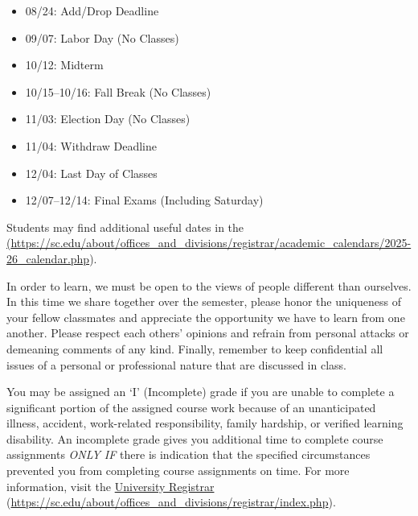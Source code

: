 \documentclass[11pt,letterpaper]{article}
\begin{document}

	\begin{itemize}
	\item 08/24: Add/Drop Deadline
	\item 09/07: Labor Day (No Classes)
	\item 10/12: Midterm
	\item 10/15--10/16: Fall Break (No Classes)
	\item 11/03: Election Day (No Classes)
	\item 11/04: Withdraw Deadline
	\item 12/04: Last Day of Classes
	\item 12/07--12/14: Final Exams (Including Saturday)
	\end{itemize}

Students may find additional useful dates in the \href{https://sc.edu/about/offices\_and\_divisions/registrar/academic\_calendars/2025-26\_calendar.php} (\url{https://sc.edu/about/offices\_and\_divisions/registrar/academic\_calendars/2025-26\_calendar.php}). 
\sectionbreak




In order to learn, we must be open to the views of people different than ourselves. In this time we share together over the semester, please honor the uniqueness of your fellow classmates and appreciate the opportunity we have to learn from one another. Please respect each others' opinions and refrain from personal attacks or demeaning comments of any kind. Finally, remember to keep confidential all issues of a personal or professional nature that are discussed in class. \sectionbreak





\newpage






You may be assigned an `I' (Incomplete) grade if you are unable to complete a significant portion of the assigned course work because of an unanticipated illness, accident, work-related responsibility, family hardship, or verified learning disability. An incomplete grade gives you additional time to complete course assignments {\itshape ONLY IF} there is indication that the specified circumstances prevented you from completing course assignments on time. For more information, visit the \href{https://sc.edu/about/offices\_and\_divisions/registrar/index.php}{University Registrar} (\url{https://sc.edu/about/offices\_and\_divisions/registrar/index.php}). \sectionbreak
\end{document}
